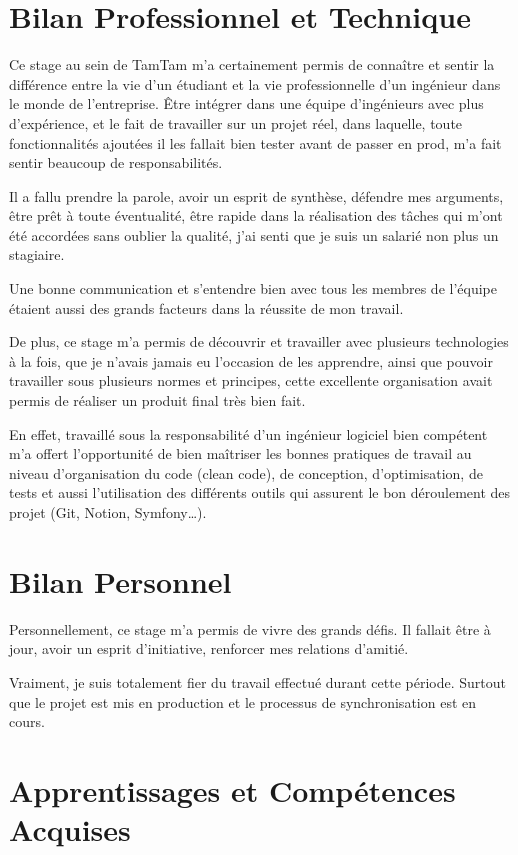 \section{Bilan Professionnel et Technique}

Ce stage au sein de TamTam m'a certainement permis de connaître et sentir la différence entre la vie d'un étudiant et la vie professionnelle d'un ingénieur dans le monde de l'entreprise. Être intégrer dans une équipe d'ingénieurs avec plus d'expérience, et le fait de travailler sur un projet réel, dans laquelle, toute fonctionnalités ajoutées il les fallait bien tester avant de passer en prod, m'a fait sentir beaucoup de responsabilités.

Il a fallu prendre la parole, avoir un esprit de synthèse, défendre mes arguments, être prêt à toute éventualité, être rapide dans la réalisation des tâches qui m'ont été accordées sans oublier la qualité, j'ai senti que je suis un salarié non plus un stagiaire.

Une bonne communication et s'entendre bien avec tous les membres de l'équipe étaient aussi des grands facteurs dans la réussite de mon travail.

De plus, ce stage m'a permis de découvrir et travailler avec plusieurs technologies à la fois, que je n'avais jamais eu l'occasion de les apprendre, ainsi que pouvoir travailler sous plusieurs normes et principes, cette excellente organisation avait permis de réaliser un produit final très bien fait.

En effet, travaillé sous la responsabilité d'un ingénieur logiciel bien compétent m'a offert l'opportunité de bien maîtriser les bonnes pratiques de travail au niveau d'organisation du code (clean code), de conception, d'optimisation, de tests et aussi l'utilisation des différents outils qui assurent le bon déroulement des projet (Git, Notion, Symfony…).

\section{Bilan Personnel}

Personnellement, ce stage m'a permis de vivre des grands défis. Il fallait être à jour, avoir un esprit d'initiative, renforcer mes relations d'amitié.

Vraiment, je suis totalement fier du travail effectué durant cette période. Surtout que le projet est mis en production et le processus de synchronisation est en cours.

\section{Apprentissages et Compétences Acquises}

